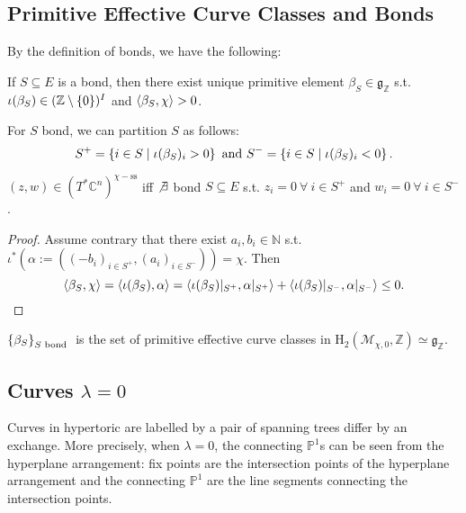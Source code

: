 \documentclass[b5paper]{article}
\newcommand{\mathintitle}[1]{\texorpdfstring{$#1$}{\detokenize{#1}}}
\newcommand{\MM}{\mathcal{M}}
\newcommand{\HH}{\mathrm{H}}
\newcommand{\sstab}{\mathrm{ss}}
\begin{document}
\subsection{Primitive Effective Curve Classes and Bonds}

By the definition of bonds, we have the following:
\begin{proposition}[pps:]{}
    If $S\subseteq E$ is a bond, then there exist unique primitive element $\beta_S\in \mathfrak{g}_\mathbb{Z}$ s.t. $\iota(\beta_S)\in (\mathbb{Z}\setminus \left\{0\right\})^I$ and $\langle \beta_S,\chi\rangle>0$.
\end{proposition}

For $S$ bond, we can partition $S$ as follows:
\[
    S^+=\left\{i\in S\mid \iota(\beta_S)_i>0\right\}\textnormal{ and }S^-=\left\{i\in S\mid \iota(\beta_S)_i<0\right\}.
\]


\begin{corollary}[crl:]{}
    $(z,w)\in (T^*\mathbb{C}^n)^{\chi-\sstab}$ iff $\not\exists$ bond $S\subseteq E$ s.t. $z_i=0\ \forall\ i\in S^+$ and $w_i=0\ \forall\ i\in S^-$.
    \begin{proof}
        Assume contrary that there exist $a_i,b_i\in \mathbb{N}$ s.t. $\iota^*(\alpha:=((-b_i)_{i\in S^+},(a_i)_{i\in S^-}))=\chi$. Then
        \[
            \langle \beta_S,\chi\rangle=\langle \iota(\beta_S),\alpha\rangle=\langle \iota(\beta_S)|_{S^+},\alpha|_{S^+}\rangle+\langle \iota(\beta_S)|_{S^-},\alpha|_{S^-}\rangle\leq 0.
        \]
    \end{proof}
\end{corollary}

\begin{theorem}[thm:]{}
    $\left\{\beta_S\right\}_{S\textnormal{ bond }}$ is the set of primitive effective curve classes in $\HH_2(\MM_{\chi,0},\mathbb{Z})\simeq \mathfrak{g}_{\mathbb{Z}}$.
\end{theorem}

\subsection{Curves \mathintitle{\lambda=0}}

Curves in hypertoric are labelled by a pair of spanning trees differ by an exchange.
More precisely, when $\lambda=0$, the connecting $\mathbb{P}^1$s can be seen from the hyperplane arrangement: fix points are the intersection points of the hyperplane arrangement and the connecting $\mathbb{P}^1$ are the line segments connecting the intersection points.
\end{document}
